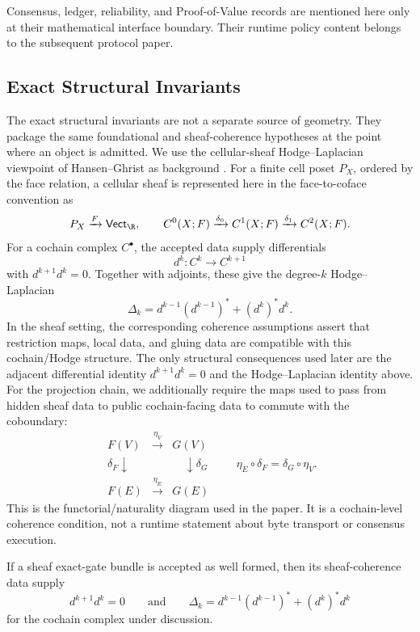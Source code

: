 Consensus, ledger, reliability, and Proof-of-Value records are mentioned here
only at their mathematical interface boundary. Their runtime policy content
belongs to the subsequent protocol paper.

\subsection{Exact Structural Invariants}

The exact structural invariants are not a separate source of geometry. They
package the same foundational and sheaf-coherence hypotheses at the point
where an object is admitted. We use the cellular-sheaf Hodge--Laplacian
viewpoint of Hansen--Ghrist as background \cite{hansenGhrist2018sheaves}. For
a finite cell poset \(P_X\), ordered by the face relation, a cellular sheaf is
represented here in the face-to-coface convention as
\[
  P_X\xrightarrow{F}\mathsf{Vect}_{\R},
  \qquad
  C^0(X;F)\xrightarrow{\delta_0}C^1(X;F)
  \xrightarrow{\delta_1}C^2(X;F).
\]
For a cochain complex \(C^\bullet\), the accepted data supply differentials
\[
  d^k:C^k\longrightarrow C^{k+1}
\]
with \(d^{k+1}d^k=0\). Together with adjoints, these give the degree-\(k\)
Hodge--Laplacian
\[
  \Delta_k=d^{k-1}(d^{k-1})^\ast+(d^k)^\ast d^k.
\]
In the sheaf setting, the corresponding coherence assumptions assert that
restriction maps, local data, and gluing data are compatible with this
cochain/Hodge structure. The only structural consequences used later are the
adjacent differential identity \(d^{k+1}d^k=0\) and the Hodge--Laplacian
identity above.
For the projection chain, we additionally require the maps used to pass from
hidden sheaf data to public cochain-facing data to commute with the
coboundary:
\[
\begin{array}{ccc}
  F(V) & \xrightarrow{\eta_V} & G(V)\\
  \delta_F\downarrow\phantom{\delta_F} & & \phantom{\delta_G}\downarrow\delta_G\\
  F(E) & \xrightarrow{\eta_E} & G(E)
\end{array}
\qquad
\eta_E\circ\delta_F=\delta_G\circ\eta_V .
\]
This is the functorial/naturality diagram used in the paper. It is a
cochain-level coherence condition, not a runtime statement about byte transport
or consensus execution.

\begin{proposition}\label{prop:exact-structural-preconditions}
  If a sheaf exact-gate bundle is accepted as well formed, then its
  sheaf-coherence data supply
  \[
    d^{k+1}d^k=0
    \qquad\text{and}\qquad
    \Delta_k=d^{k-1}(d^{k-1})^\ast+(d^k)^\ast d^k
  \]
  for the cochain complex under discussion.
\end{proposition}

